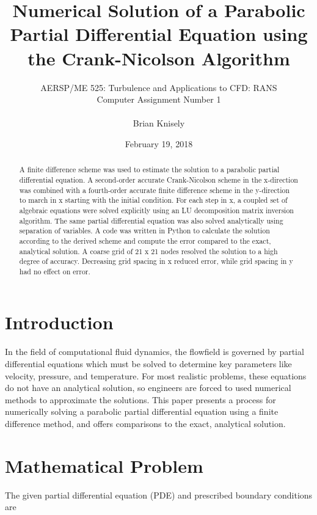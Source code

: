 \documentclass[10pt]{article}
\title{Numerical Solution of a Parabolic Partial Differential Equation using the Crank-Nicolson Algorithm}
\author{AERSP/ME 525: Turbulence and Applications to CFD: RANS\\
Computer Assignment Number 1\\ \\
Brian Knisely}
\date{February 19, 2018}
\begin{document}


\maketitle
\thispagestyle{empty}

\vspace{-20pt}
\begin{abstract}
\noindent
A finite difference scheme was used to estimate the solution to a parabolic partial differential equation. A second-order accurate Crank-Nicolson scheme in the x-direction was combined with a fourth-order accurate finite difference scheme in the y-direction to march in x starting with the initial condition. For each step in x, a coupled set of algebraic equations were solved explicitly using an LU decomposition matrix inversion algorithm. The same partial differential equation was also solved analytically using separation of variables. A code was written in Python to calculate the solution according to the derived scheme and compute the error compared to the exact, analytical solution. A coarse grid of 21 x 21 nodes resolved the solution to a high degree of accuracy. Decreasing grid spacing in x reduced error, while grid spacing in y had no effect on error.
\end{abstract}


\vspace{-8pt}
\thispagestyle{plain}
\section*{Introduction}
\vspace{-8pt}
In the field of computational fluid dynamics, the flowfield is governed by partial differential equations which must be solved to determine key parameters like velocity, pressure, and temperature. For most realistic problems, these equations do not have an analytical solution, so engineers are forced to used numerical methods to approximate the solutions. This paper presents a process for numerically solving a parabolic partial differential equation using a finite difference method, and offers comparisons to the exact, analytical solution.

\section*{Mathematical Problem}
\vspace{-8pt}
The given partial differential equation (PDE) and prescribed boundary conditions are
\end{document}
